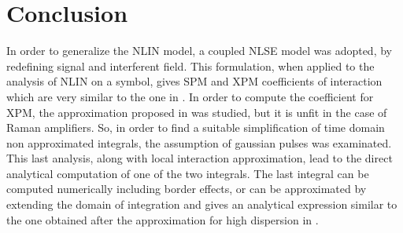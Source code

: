 \documentclass[10pt, lettersize, journal, onecolumn]{IEEEtran}
\begin{document}
\begin{comment}
Quindi dobbiamo verificare la seguente uguaglianza
\begin{equation}
	U_0 \sqrt{\dfrac{1+iD(z)}{1+D^2(z)}} \exp\left[-\dfrac{t^2}{2T_0^2} \dfrac{1+iD(z)}{1+D^2(z)}\right]  \stackrel{?}{=}  U_0 \sqrt{\frac{i}{2\pi D(z)}} \exp\left[-\dfrac{t^2}{2T_0^2} \left(\dfrac{1}{D^2(z)}\right)\right]
\end{equation}
Queste espressioni non sembrano tuttavia combaciare esattamente. Possiamo approssimare il termine di sinistra, per $D(z)>>1$ con
\begin{equation}
	U_0 \sqrt{\dfrac{i}{D(z)}} \exp\left[-\dfrac{t^2}{2T_0^2} \dfrac{1}{D^2(z)}\right] {\color{darkred} \exp\left[-\dfrac{t^2}{2T_0^2} \dfrac{i}{D(z)}\right]}
\end{equation}
tuttavia si nota che manca un termine $2\pi$ a \textit{denominatore}, e l'esponenziale di fase \textit{scompare} dall'espressione.

\vspace{20pt}
La conclusione \textit{provvisoria} è che l'approssimazione non vale in maniera esatta, ed anzi la sua validità nel caso gaussiano è da valutare in un'ulteriore analisi.
\end{comment}

\section{Conclusion}
In order to generalize the NLIN model, a coupled NLSE model was adopted, by redefining signal and interferent field. This formulation, when applied to the analysis of NLIN on a symbol, gives SPM and XPM coefficients of interaction which are very similar to the one in \cite{Dar_2013}. In order to compute the coefficient for XPM, the approximation proposed in \cite{Dar_2013} was studied, but it is unfit in the case of Raman amplifiers. So, in order to find a suitable simplification of time domain non approximated integrals, the assumption of gaussian pulses was examinated. This last analysis, along with local interaction approximation, lead to the direct analytical computation of one of the two integrals. The last integral can be computed numerically including border effects, or can be approximated by extending the domain of integration and gives an analytical expression similar to the one obtained after the approximation for high dispersion in \cite{Dar_2013}.
\printbibliography
\hrulefill
\end{document}
